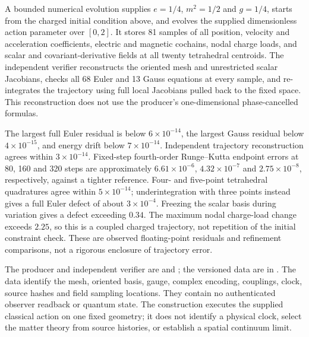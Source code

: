A bounded numerical evolution supplies \(e=1/4\), \(m^2=1/2\) and
\(g=1/4\), starts from the charged initial condition above, and evolves
the supplied dimensionless action parameter over \([0,2]\). It stores
81 samples of all position, velocity and acceleration coefficients,
electric and magnetic cochains, nodal charge loads, and scalar and
covariant-derivative fields at all twenty tetrahedral centroids.
The independent verifier reconstructs the oriented mesh and unrestricted
scalar Jacobians, checks all 68 Euler and 13 Gauss equations at every
sample, and re-integrates the trajectory using full local Jacobians
pulled back to the fixed space. This reconstruction does not use the
producer's one-dimensional phase-cancelled formulas.

The largest full Euler residual is below \(6\times10^{-14}\), the
largest Gauss residual below \(4\times10^{-15}\), and energy drift
below \(7\times10^{-14}\). Independent trajectory reconstruction
agrees within \(3\times10^{-14}\). Fixed-step fourth-order
Runge--Kutta endpoint errors at 80, 160 and 320 steps are approximately
\(6.61\times10^{-6}\), \(4.32\times10^{-7}\) and
\(2.75\times10^{-8}\), respectively, against a tighter reference.
Four- and five-point tetrahedral quadratures agree within
\(5\times10^{-14}\); underintegration with three points instead
gives a full Euler defect of about \(3\times10^{-4}\).
Freezing the scalar basis during variation gives a defect exceeding
\(0.34\). The maximum nodal charge-load change exceeds \(2.25\),
so this is a coupled charged trajectory, not repetition of the initial
constraint check. These are observed floating-point residuals and
refinement comparisons, not a rigorous enclosure of trajectory error.

The producer and independent verifier are
 and
; the
versioned data are in
.
The data identify the mesh, oriented basis, gauge, complex encoding,
couplings, clock, source hashes and field sampling locations. They contain
no authenticated observer readback or quantum state. The construction
executes the supplied classical action on one fixed geometry; it does
not identify a physical clock, select the matter theory from source
histories, or establish a spatial continuum limit.
